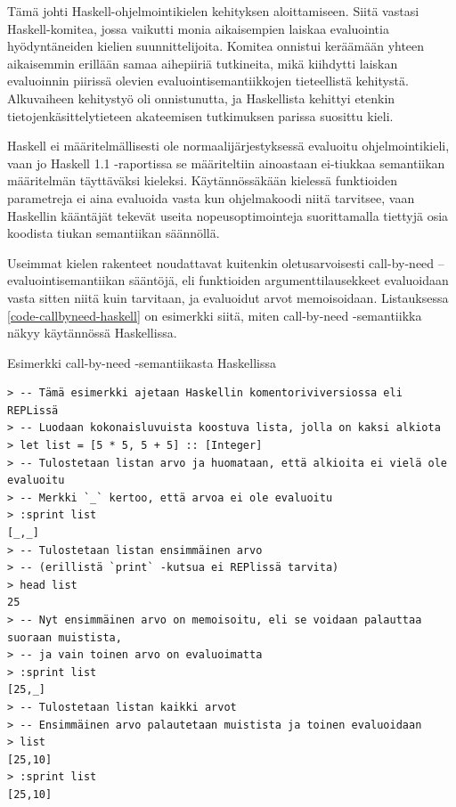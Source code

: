 Tämä johti Haskell-ohjelmointikielen kehityksen aloittamiseen. Siitä vastasi Haskell-komitea, jossa vaikutti monia aikaisempien laiskaa evaluointia hyödyntäneiden kielien suunnittelijoita. Komitea onnistui keräämään yhteen aikaisemmin erillään samaa aihepiiriä tutkineita, mikä kiihdytti laiskan evaluoinnin piirissä olevien evaluointisemantiikkojen tieteellistä kehitystä. Alkuvaiheen kehitystyö oli onnistunutta, ja Haskellista kehittyi etenkin tietojenkäsittelytieteen akateemisen tutkimuksen parissa suosittu kieli.

Haskell ei määritelmällisesti ole normaalijärjestyksessä evaluoitu ohjelmointikieli, vaan jo Haskell 1.1 -raportissa \citep{yale1991report} se määriteltiin ainoastaan ei-tiukkaa semantiikan määritelmän täyttäväksi kieleksi. Käytännössäkään kielessä funktioiden parametreja ei aina evaluoida vasta kun ohjelmakoodi niitä tarvitsee, vaan Haskellin kääntäjät tekevät useita nopeusoptimointeja suorittamalla tiettyjä osia koodista tiukan semantiikan säännöllä.

Useimmat kielen rakenteet noudattavat kuitenkin oletusarvoisesti call-by-need –evaluointisemantiikan sääntöjä, eli funktioiden argumenttilausekkeet evaluoidaan vasta sitten niitä kuin tarvitaan, ja evaluoidut arvot memoisoidaan. Listauksessa \ref{code-callbyneed-haskell} on esimerkki siitä, miten call-by-need -semantiikka näkyy käytännössä Haskellissa.

\begin{listing}[H]
  \caption{Esimerkki call-by-need -semantiikasta Haskellissa}
  \label{code-callbyneed-haskell}
  \bigskip
  \begin{verbatim}
> -- Tämä esimerkki ajetaan Haskellin komentoriviversiossa eli REPLissä
> -- Luodaan kokonaisluvuista koostuva lista, jolla on kaksi alkiota
> let list = [5 * 5, 5 + 5] :: [Integer]
> -- Tulostetaan listan arvo ja huomataan, että alkioita ei vielä ole evaluoitu
> -- Merkki `_` kertoo, että arvoa ei ole evaluoitu
> :sprint list
[_,_]
> -- Tulostetaan listan ensimmäinen arvo
> -- (erillistä `print` -kutsua ei REPlissä tarvita)
> head list
25
> -- Nyt ensimmäinen arvo on memoisoitu, eli se voidaan palauttaa suoraan muistista,
> -- ja vain toinen arvo on evaluoimatta
> :sprint list
[25,_]
> -- Tulostetaan listan kaikki arvot
> -- Ensimmäinen arvo palautetaan muistista ja toinen evaluoidaan
> list
[25,10]
> :sprint list
[25,10]
\end{verbatim}
\end{listing}

